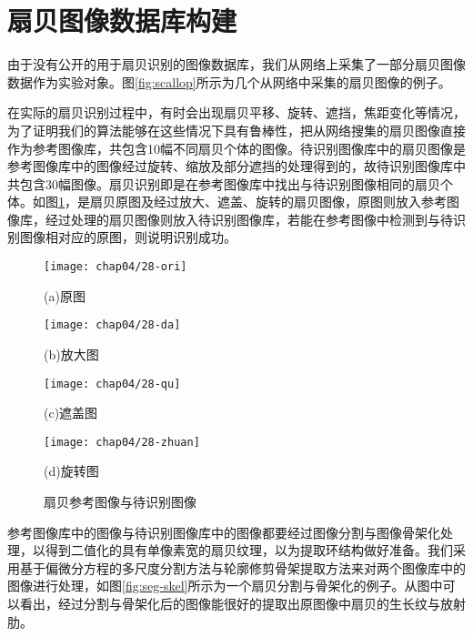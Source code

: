 \section{扇贝图像数据库构建}
\label{}
由于没有公开的用于扇贝识别的图像数据库，我们从网络上采集了一部分扇贝图像数据作为实验对象。图\ref{fig:scallop}所示为几个从网络中采集的扇贝图像的例子。

在实际的扇贝识别过程中，有时会出现扇贝平移、旋转、遮挡，焦距变化等情况，为了证明我们的算法能够在这些情况下具有鲁棒性，把从网络搜集的扇贝图像直接作为参考图像库，共包含10幅不同扇贝个体的图像。待识别图像库中的扇贝图像是参考图像库中的图像经过旋转、缩放及部分遮挡的处理得到的，故待识别图像库中共包含30幅图像。扇贝识别即是在参考图像库中找出与待识别图像相同的扇贝个体。如图\ref{fig:process}，是扇贝原图及经过放大、遮盖、旋转的扇贝图像，原图则放入参考图像库，经过处理的扇贝图像则放入待识别图像库，若能在参考图像中检测到与待识别图像相对应的原图，则说明识别成功。

\begin{figure}
\centering
  \begin{minipage}[b]{0.48\textwidth} 
      \centering 
      \texttt{[image: chap04/28-ori]}
        \centerline{(a)原图}\medskip
    \end{minipage}
  \begin{minipage}[b]{0.48\textwidth}
    \centering
    \texttt{[image: chap04/28-da]}
      \centerline{(b)放大图}\medskip
    \end{minipage}
  \begin{minipage}[b]{0.48\textwidth} 
      \centering 
      \texttt{[image: chap04/28-qu]}
        \centerline{(c)遮盖图}\medskip
    \end{minipage}
  \begin{minipage}[b]{0.48\textwidth}
    \centering
    \texttt{[image: chap04/28-zhuan]}
      \centerline{(d)旋转图}\medskip
  \end{minipage}
\caption{扇贝参考图像与待识别图像}
\label{fig:process}
\end{figure}

参考图像库中的图像与待识别图像库中的图像都要经过图像分割与图像骨架化处理，以得到二值化的具有单像素宽的扇贝纹理，以为提取环结构做好准备。我们采用基于偏微分方程的多尺度分割方法与轮廓修剪骨架提取方法来对两个图像库中的图像进行处理，如图\ref{fig:seg-skel}所示为一个扇贝分割与骨架化的例子。从图中可以看出，经过分割与骨架化后的图像能很好的提取出原图像中扇贝的生长纹与放射肋。

